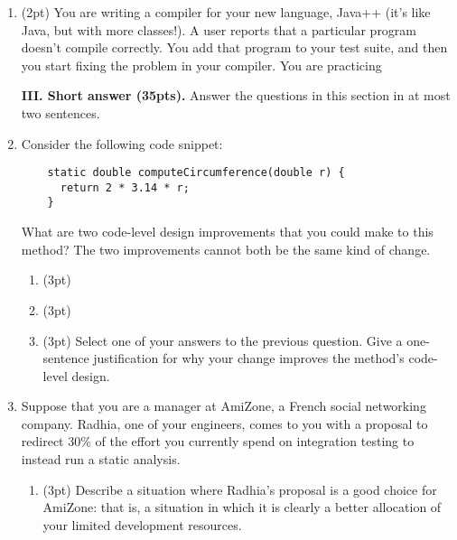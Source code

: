 \documentclass{report}
\newif\ifkey
\newcommand{\answershort}[1]{\ifkey\color{red}\underline{\textbf{#1}}\color{black}\else\underline{\hspace{3in}}\fi\xspace}
\newcommand{\answerlong}[1]{\ifkey\color{red}\textbf{#1}\color{black}\else\vspace{0.5in}\fi\xspace}
\newcommand{\shortpts}{35}
\newcommand*{\pts}[1]{\addtocounter{points}{#1}(#1pt)}
\begin{document}
\begin{spacing}{1.4}
\begin{enumerate}[leftmargin=*]
   \item \pts{2} You are writing a compiler for your new language, Java++ (it's like Java, but with more classes!).
     A user reports that a particular program doesn't compile correctly. You add that program to your test suite,
     and then you start fixing the problem in your compiler. You are practicing
     \\ \answershort{test-driven development}
     
  \newpage

  \textbf{III. Short answer (\shortpts pts).} Answer the questions in this section in at most two sentences.

\item Consider the following code snippet: \\
  \begin{lstlisting}
    static double computeCircumference(double r) {
      return 2 * 3.14 * r;
    }
  \end{lstlisting}

  What are two code-level design improvements that you could make to this method? The two improvements cannot both be the same kind of change.
  \begin{enumerate}
  \item \pts{3} \answershort{replace 3.14 with a PI constant} 
  \item \pts{3} \answershort{rename ``r'' to ``radius'' or rename ``computeCircumference'' to ``circumference''}

  \item \pts{3} Select one of your answers to the previous question. Give a one-sentence justification for why your change
  improves the method's code-level design.

  \answerlong{For 1. above: ``avoid magic numbers'' or ``more self-documenting''. For 2. above: ``radius'' is more descriptive than ``r'', or ``compute'' is a verb, but the method returns a noun-like type.}

  \end{enumerate}

  \item Suppose that you are a manager at AmiZone, a French social networking company. Radhia, one of your engineers, comes to you
    with a proposal to redirect 30\% of the effort you currently spend on integration testing to instead run a static analysis.
\begin{enumerate}
  \item \pts{3} Describe a situation where Radhia's proposal is a good choice for AmiZone: that is, a situation in which it
    is clearly a better allocation of your limited development resources.
    \\
    \answerlong{Answers can vary. ``AmiZone is concerned about security bugs.'' is the shortest, best answer; short answers that
      identify a class of bugs that static analysis is good at will get full credit..}


\end{enumerate}
\end{enumerate}
\end{spacing}
\end{document}
